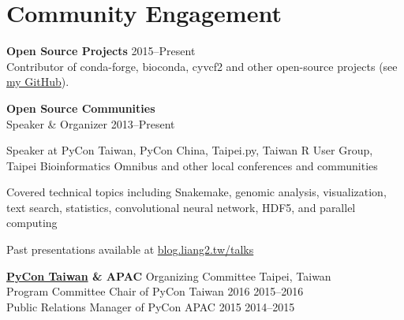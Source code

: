 \section{Community Engagement}

\begin{entrylist}

\item \textbf{Open Source Projects}\hfill
    2015--Present\\
    Contributor of conda-forge, bioconda, cyvcf2 and other open-source projects
    (see \href{https://github.com/ccwang002}{my GitHub}).



\item \textbf{Open Source Communities}\\
    Speaker \& Organizer\hfill
    2013--Present
    \begin{detaillist}
        \item Speaker at PyCon Taiwan, PyCon China, Taipei.py, Taiwan R User Group, Taipei Bioinformatics Omnibus and other local conferences and communities
        \item Covered technical topics including Snakemake, genomic analysis, visualization, text search, statistics, convolutional neural network, HDF5, and parallel computing
        \item Past presentations available at \href{http://blog.liang2.tw/talks/}{blog.liang2.tw/talks}
    \end{detaillist}

\item {
        \bfseries
        \href{https://pycon.tw}{PyCon Taiwan}
        \& APAC%
    } Organizing Committee\hfill
        Taipei, Taiwan\\
        Program Committee Chair of PyCon Taiwan 2016\hfill
        2015--2016\\
        Public Relations Manager of PyCon APAC 2015\hfill
        2014--2015
\end{entrylist}
